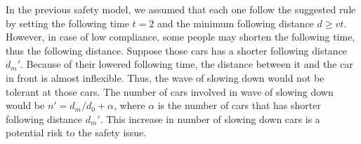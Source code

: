 In the previous safety model, we assumed that each one follow the suggested rule by setting the following time $t = 2$ and  the minimum following distance $d \ge vt$. However, in case of low compliance, some people may shorten the following time, thus the following distance. Suppose those cars has a shorter following distance $d_m'$. Because of their lowered following time, the distance between it and the car in front is almost inflexible. Thus, the wave of slowing down would not be tolerant at those cars. The number of cars involved in wave of slowing down would be $n' = d_m/d_0+\alpha$, where $\alpha$ is the number of cars that has shorter following distance $d_m'$. This increase in number of slowing down cars is a potential risk to the safety issue. 